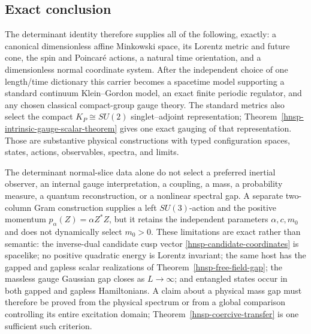 \subsection{Exact conclusion}

The determinant identity therefore supplies all of the following, exactly:
a canonical dimensionless affine Minkowski space, its Lorentz metric and
future cone, the spin and Poincar\'e actions, a natural time orientation, and
a dimensionless normal coordinate system.  After the independent choice of
one length/time dictionary this carrier becomes a spacetime model supporting a
standard continuum Klein--Gordon model, an exact finite periodic regulator,
and any chosen classical compact-group gauge theory.  The standard metrics
also select the compact \(K_P\cong SU(2)\) singlet--adjoint representation;
Theorem~\ref{hnsp-intrinsic-gauge-scalar-theorem} gives one exact gauging of
that representation.  Those are substantive physical constructions with
typed configuration spaces, states, actions, observables, spectra, and
limits.

The determinant normal-slice data alone do not select a preferred inertial
observer, an internal gauge interpretation, a coupling, a mass, a probability
measure, a quantum reconstruction, or a nonlinear spectral gap.  A separate
two-column Gram construction supplies a left \(SU(3)\)-action and the
positive momentum \(p_\alpha(Z)=\alpha Z^*Z\), but it retains the independent
parameters \(\alpha,c,m_0\) and does not dynamically select \(m_0>0\).
These limitations are exact rather than semantic: the inverse-dual candidate
cusp vector \eqref{hnsp-candidate-coordinates} is spacelike; no
positive quadratic energy is Lorentz invariant; the same host has the gapped
and gapless scalar realizations of Theorem~\ref{hnsp-free-field-gap}; the
massless gauge Gaussian gap closes as \(L\to\infty\); and entangled states
occur in both gapped and gapless Hamiltonians.  A claim about a physical mass
gap must therefore be proved from the physical spectrum or from a global
comparison controlling its entire excitation domain;
Theorem~\ref{hnsp-coercive-transfer} is one sufficient such criterion.
